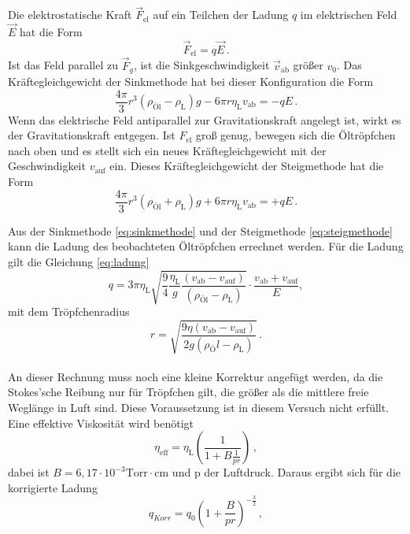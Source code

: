 Die elektrostatische Kraft $\vec{F}_\text{el}$ auf ein Teilchen der Ladung $q$ im elektrischen Feld $\vec{E}$ hat die Form 
\begin{equation*}
    \vec{F}_\text{el} = q \vec{E}\, .
    \label{eq:Estat}
\end{equation*}
Ist das Feld parallel zu $\vec{F}_g$, ist die Sinkgeschwindigkeit $\vec{v}_\text{ab}$ größer $v_0$.
Das Kräftegleichgewicht der Sinkmethode hat bei dieser Konfiguration die Form 
\begin{equation}
    \frac{4 \pi}{3} r^3(\rho_\text{Öl} - \rho_\text{L})g - 6 \pi r \eta_\text{L} v_\text{ab} = - q E \, .
    \label{eq:sinkmethode}
\end{equation}
Wenn das elektrische Feld antiparallel zur Gravitationskraft angelegt ist, wirkt es der Gravitationskraft entgegen.
Ist $F_\text{el}$ groß genug, bewegen sich die Öltröpfchen nach oben und es stellt sich ein neues Kräftegleichgewicht mit der Geschwindigkeit $v_\text{auf}$ ein.
Dieses Kräftegleichgewicht der Steigmethode hat die Form
\begin{equation}
    \frac{4 \pi}{3} r^3(\rho_\text{Öl} + \rho_\text{L})g + 6 \pi r \eta_\text{L} v_\text{ab} = + q E \, .
    \label{eq:steigmethode}
\end{equation}

Aus der Sinkmethode \eqref{eq:sinkmethode} und der Steigmethode \eqref{eq:steigmethode} kann die Ladung des beobachteten Öltröpfchen errechnet werden.
Für die Ladung gilt die Gleichung \eqref{eq:ladung}
\begin{equation}
    q = 3 \pi \eta_\text{L} \sqrt{\frac{9}{4} \frac{\eta_\text{L}}{g} \frac{(v_\text{ab} - v_\text{auf})}{(\rho_\text{Öl} - \rho_\text{L})}} \cdot \frac{v_\text{ab}+ v_\text{auf}}{E} ,
    \label{eq:ladung}
\end{equation}
mit dem Tröpfchenradius 
\begin{equation}
    r = \sqrt{\frac{9 \eta (v_\text{ab}-v_\text{auf})}{2 g (\rho_Öl - \rho_\text{L})}}\, .
    \label{eq:rmitEfled}
\end{equation} \\

An dieser Rechnung muss noch eine kleine Korrektur angefügt werden, da die Stokes'sche Reibung nur für Tröpfchen gilt, die größer als die mittlere freie Weglänge in Luft sind.
Diese Voraussetzung ist in diesem Versuch nicht erfüllt. Eine effektive Viskosität wird benötigt
\begin{equation}
    \eta_\text{eff} = \eta_\text{L} \left( \frac{1}{1+ B \frac{1}{p r}}       \right) \, ,
    \label{eq:Veff}
\end{equation}
dabei ist $B = 6,17 \cdot 10^{-3} \text{Torr} \cdot \unit{\centi\meter}$ und p der Luftdruck. Daraus ergibt sich für die korrigierte Ladung
\begin{equation}
    q_{Korr} = q_0 \left(1 + \frac{B}{p r}\right)^{-\frac{3}{2}}  \, ,
    \label{eq:qKorr}
\end{equation}
